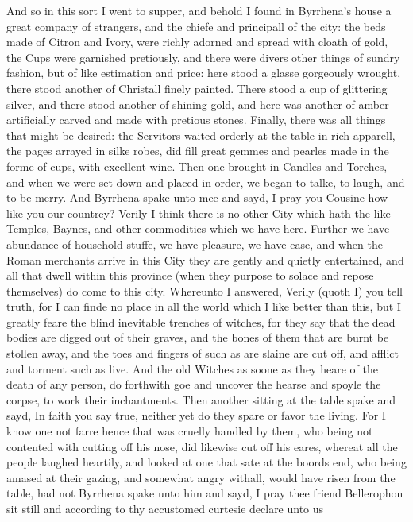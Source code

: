 And so in this sort I went to supper, and behold I found in Byrrhena’s
house a great company of strangers, and the chiefe and principall of the city:
the beds made of Citron and Ivory, were richly adorned and spread with cloath
of gold, the Cups were garnished pretiously, and there were divers other things
of sundry fashion, but of like estimation and price: here stood a glasse
gorgeously wrought, there stood another of Christall finely painted. There
stood a cup of glittering silver, and there stood another of shining gold, and
here was another of amber artificially carved and made with pretious stones.
Finally, there was all things that might be desired: the Servitors waited
orderly at the table in rich apparell, the pages arrayed in silke robes, did
fill great gemmes and pearles made in the forme of cups, with excellent wine.
Then one brought in Candles and Torches, and when we were set down and placed
in order, we began to talke, to laugh, and to be merry. And Byrrhena spake unto
mee and sayd, I pray you Cousine how like you our countrey? Verily I think
there is no other City which hath the like Temples, Baynes, and other
commodities which we have here. Further we have abundance of household stuffe,
we have pleasure, we have ease, and when the Roman merchants arrive in this
City they are gently and quietly entertained, and all that dwell within this
province (when they purpose to solace and repose themselves) do come to this
city. Whereunto I answered, Verily (quoth I) you tell truth, for I can finde no
place in all the world which I like better than this, but I greatly feare the
blind inevitable trenches of witches, for they say that the dead bodies are
digged out of their graves, and the bones of them that are burnt be stollen
away, and the toes and fingers of such as are slaine are cut off, and afflict
and torment such as live. And the old Witches as soone as they heare of the
death of any person, do forthwith goe and uncover the hearse and spoyle the
corpse, to work their inchantments. Then another sitting at the table spake and
sayd, In faith you say true, neither yet do they spare or favor the living. For
I know one not farre hence that was cruelly handled by them, who being not
contented with cutting off his nose, did likewise cut off his eares, whereat
all the people laughed heartily, and looked at one that sate at the boords end,
who being amased at their gazing, and somewhat angry withall, would have risen
from the table, had not Byrrhena spake unto him and sayd, I pray thee friend
Bellerophon sit still and according to thy accustomed curtesie declare unto us
